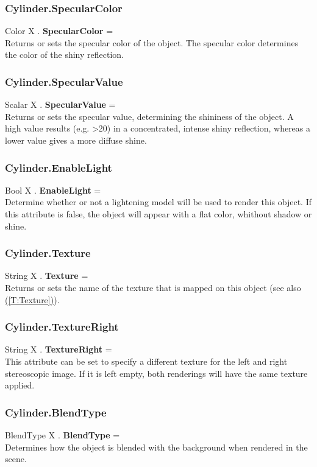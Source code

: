 \documentclass[10pt]{book}
\newcommand{\linkitem}[1]{\hyperref[#1]{\nameref{#1} (\ref{#1})}}
\begin{document}
\subsubsection{Cylinder.SpecularColor \label{F:Cylinder:SpecularColor}}
Color X . \textbf{SpecularColor} = \\
Returns or sets the specular color of the object. The specular color determines the color of the shiny reflection.

\subsubsection{Cylinder.SpecularValue \label{F:Cylinder:SpecularValue}}
Scalar X . \textbf{SpecularValue} = \\
Returns or sets the specular value, determining the shininess of the object. A high value results (e.g. >20) in a concentrated, intense shiny reflection, whereas a lower value gives a more diffuse shine.

\subsubsection{Cylinder.EnableLight \label{F:Cylinder:EnableLight}}
Bool X . \textbf{EnableLight} = \\
Determine whether or not a lightening model will be used to render this object. If this attribute is false, the object will appear with a flat color, whithout shadow or shine.

\subsubsection{Cylinder.Texture \label{F:Cylinder:Texture}}
String X . \textbf{Texture} = \\
Returns or sets the name of the texture that is mapped on this object (see also \linkitem{T:Texture}).

\subsubsection{Cylinder.TextureRight \label{F:Cylinder:TextureRight}}
String X . \textbf{TextureRight} = \\
This attribute can be set to specify a different texture for the left and right stereoscopic image. If it is left empty, both renderings will have the same texture applied.

\subsubsection{Cylinder.BlendType \label{F:Cylinder:BlendType}}
BlendType X . \textbf{BlendType} = \\
Determines how the object is blended with the background when rendered in the scene.
\end{document}
